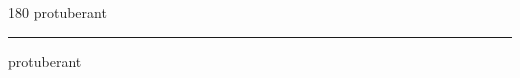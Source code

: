 
\begin{frame}
\begin{center}
\begin{turn}{180}
{\fontsize{2.5cm}{1em}\selectfont protuberant}
\end{turn}
\vspace{1em}\par  
\hrule
\vspace{1em}\par  
{\fontsize{2.5cm}{1em}\selectfont protuberant}
\end{center}
\end{frame}

